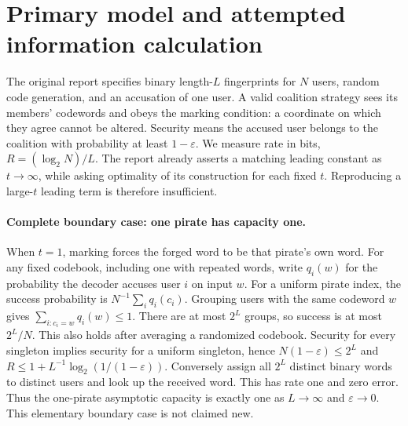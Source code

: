 \documentclass[11pt]{article}
\begin{document}
\section{Primary model and attempted information calculation}
The original report specifies binary length-$L$ fingerprints for $N$ users,
random code generation, and an accusation of one user. A valid coalition strategy
sees its members' codewords and obeys the marking condition: a coordinate on
which they agree cannot be altered. Security means the accused user belongs
to the coalition with probability at least $1-\varepsilon$. We measure rate
in bits, $R=(\log_2N)/L$. The report already asserts a matching leading
constant as $t\to\infty$, while asking optimality of its construction for
each fixed $t$. Reproducing a large-$t$ leading term is therefore insufficient.

\paragraph{Complete boundary case: one pirate has capacity one.}
When $t=1$, marking forces the forged word to be that pirate's own word.
For any fixed codebook, including one with repeated words, write
$q_i(w)$ for the probability the decoder accuses user $i$ on input $w$.
For a uniform pirate index, the success probability is
$N^{-1}\sum_i q_i(c_i)$. Grouping users with the same codeword $w$ gives
$\sum_{i:c_i=w}q_i(w)\le1$. There are at most $2^L$ groups, so success
is at most $2^L/N$. This also holds after averaging a randomized codebook.
Security for every singleton implies security for a uniform singleton, hence
$N(1-\varepsilon)\le2^L$ and
$R\le1+L^{-1}\log_2(1/(1-\varepsilon))$.
Conversely assign all $2^L$ distinct binary words to distinct users and
look up the received word. This has rate one and zero error. Thus the
one-pirate asymptotic capacity is exactly one as $L\to\infty$ and
$\varepsilon\to0$. This elementary boundary case is not claimed new.
\end{document}
